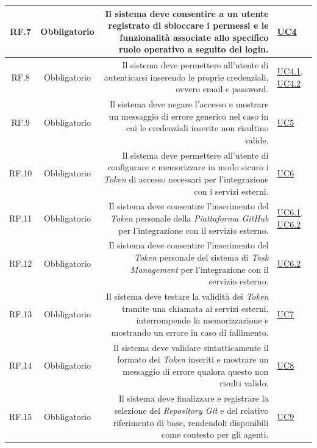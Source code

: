 \documentclass[12pt, a4paper]{article}
\begin{document}
\begin{xltabular}{\textwidth}{|c|c|D|F|}
    RF.7 & Obbligatorio & Il sistema deve consentire a un utente registrato di sbloccare i permessi e le funzionalità associate allo specifico ruolo operativo a seguito del login. & \hyperref[uc:4]{UC4} \\ \hline
    
    RF.8 & Obbligatorio & Il sistema deve permettere all'utente di autenticarsi inserendo le proprie credenziali, ovvero email e password. & \hyperref[uc:4.1]{UC4.1}, \hyperref[uc:4.2]{UC4.2} \\ \hline
    
    RF.9 & Obbligatorio & Il sistema deve negare l'accesso e mostrare un messaggio di errore generico nel caso in cui le credenziali inserite non risultino valide. & \hyperref[uc:5]{UC5} \\ \hline
    
    RF.10 & Obbligatorio & Il sistema deve permettere all'utente di configurare e memorizzare in modo sicuro i \textit{Token} di accesso necessari per l'integrazione con i servizi esterni. & \hyperref[uc:6]{UC6} \\ \hline
    
    RF.11 & Obbligatorio & Il sistema deve consentire l'inserimento del \textit{Token} personale della \textit{Piattaforma GitHub} per l'integrazione con il servizio esterno. & \hyperref[uc:6.1]{UC6.1}, \hyperref[uc:6.2]{UC6.2} \\ \hline

    RF.12 & Obbligatorio & Il sistema deve consentire l'inserimento del \textit{Token} personale del sistema di \textit{Task Management} per l'integrazione con il servizio esterno. & \hyperref[uc:6.2]{UC6.2} \\ \hline
    
    RF.13 & Obbligatorio & Il sistema deve testare la validità dei \textit{Token} tramite una chiamata ai servizi esterni, interrompendo la memorizzazione e mostrando un errore in caso di fallimento. & \hyperref[uc:7]{UC7} \\ \hline
    
    RF.14 & Obbligatorio & Il sistema deve validare sintatticamente il formato dei \textit{Token} inseriti e mostrare un messaggio di errore qualora questo non risulti valido. & \hyperref[uc:8]{UC8} \\ \hline
    
    RF.15 & Obbligatorio & Il sistema deve finalizzare e registrare la selezione del \textit{Repository Git} e del relativo riferimento di base, rendendoli disponibili come contesto per gli agenti. & \hyperref[uc:9]{UC9} \\ \hline
    

\end{xltabular}
\end{document}
